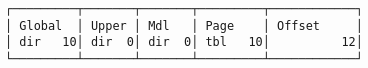 \documentclass[varwidth=35em]{standalone}
\begin{document}
\begin{verbatim}
┌─────────┬───────┬───────┬─────────┬────────────┐
│ Global  │ Upper │ Mdl   │ Page    │ Offset     │
│ dir   10│ dir  0│ dir  0│ tbl   10│          12│
└─────────┴───────┴───────┴─────────┴────────────┘
\end{verbatim}
\end{document}
